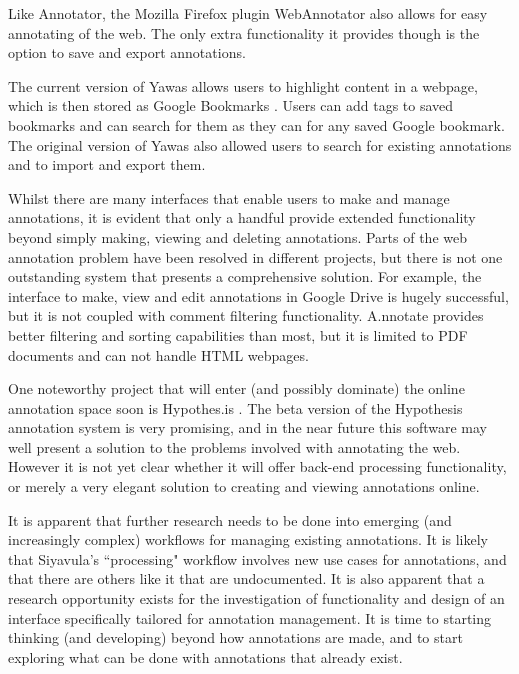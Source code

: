 Like Annotator, the Mozilla Firefox plugin WebAnnotator \citep{WebAnnotator1} \citep{WebAnnotator2} also allows for easy annotating of the web. The only extra functionality it provides though is the option to save and export annotations. 

The current version of Yawas \citep{YawasLink} allows users to highlight content in a webpage, which is then stored as Google Bookmarks \citep{GBookmarks}. Users can add tags to saved bookmarks and can search for them as they can for any saved Google bookmark. The original version of Yawas \citep{Yawas} also allowed users to search for existing annotations and to import and export them. 

Whilst there are many interfaces that enable users to make and manage annotations, it is evident that only a handful provide extended functionality beyond simply making, viewing and deleting annotations. Parts of the web annotation problem have been resolved in different projects, but there is not one outstanding system that presents a comprehensive solution. For example, the interface to make, view and edit annotations in Google Drive is hugely successful, but it is not coupled with comment filtering functionality. A.nnotate provides better filtering and sorting capabilities than most, but it is limited to PDF documents and can not handle HTML webpages. 

One noteworthy project that will enter (and possibly dominate) the online annotation space soon is Hypothes.is \citep{Hypothesis}. The beta version of the Hypothesis annotation system is very promising, and in the near future this software may well present a solution to the problems involved with annotating the web. However it is not yet clear whether it will offer back-end processing functionality, or merely a very elegant solution to creating and viewing annotations online.

It is apparent that further research needs to be done into emerging (and increasingly complex) workflows for managing existing annotations. It is likely that Siyavula's ``processing" workflow involves new use cases for annotations, and that there are others like it that are undocumented. It is also apparent that a research opportunity exists for the investigation of functionality and design of an interface specifically tailored for annotation management. It is time to starting thinking (and developing) beyond how annotations are made, and to start exploring what can be done with annotations that already exist. 